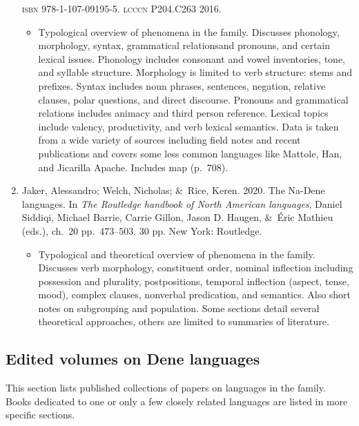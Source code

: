 \documentclass[12pt,letterpaper,oneside,article]{memoir}
\begin{document}
\begin{enumerate}
	\textsc{isbn} 978-1-107-09195-5.
	\textsc{lcccn} P204.C263 2016.
	\begin{itemize}
	\item	Typological overview of phenomena in the family.
		Discusses phonology, morphology, syntax, grammatical relationsand pronouns,
		and certain lexical issues.
		Phonology includes consonant and vowel inventories, tone, and
		syllable structure.
		Morphology is limited to verb structure: stems and prefixes.
		Syntax includes noun phrases, sentences, negation, relative clauses,
		polar questions, and direct discourse.
		Pronouns and grammatical relations includes animacy and third person reference.
		Lexical topics include valency, productivity, and verb lexical semantics.
		Data is taken from a wide variety of sources including field notes and
		recent publications and covers some less common languages like Mattole, Han,
		and Jicarilla Apache.
		Includes map (p.\ 708).
	\end{itemize}
\item	Jaker, Alessandro; Welch, Nicholas; \&\ Rice, Keren.
	2020.
	The Na-Dene languages.
	In \textit{The Routledge handbook of North American languages},
	Daniel Siddiqi, Michael Barrie, Carrie Gillon, Jason D. Haugen, \&\ Éric Mathieu (eds.),
	ch.\ 20 pp.\ 473–503.
	30 pp.
	New York: Routledge.
	\begin{itemize}
	\item	Typological and theoretical overview of phenomena in the family.
		Discusses verb morphology, constituent order, nominal inflection including
		possession and plurality, postpositions, temporal inflection
		(aspect, tense, mood), complex clauses, nonverbal predication, and semantics.
		Also short notes on subgrouping and population.
		Some sections detail several theoretical approaches, others are limited to
		summaries of literature.
	\end{itemize}
\end{enumerate}

\subsection{Edited volumes on Dene languages}\label{sec:comphist-edvol}

This section lists published collections of papers on languages in the family.
Books dedicated to one or only a few closely related languages are listed in more specific sections.
\end{document}
